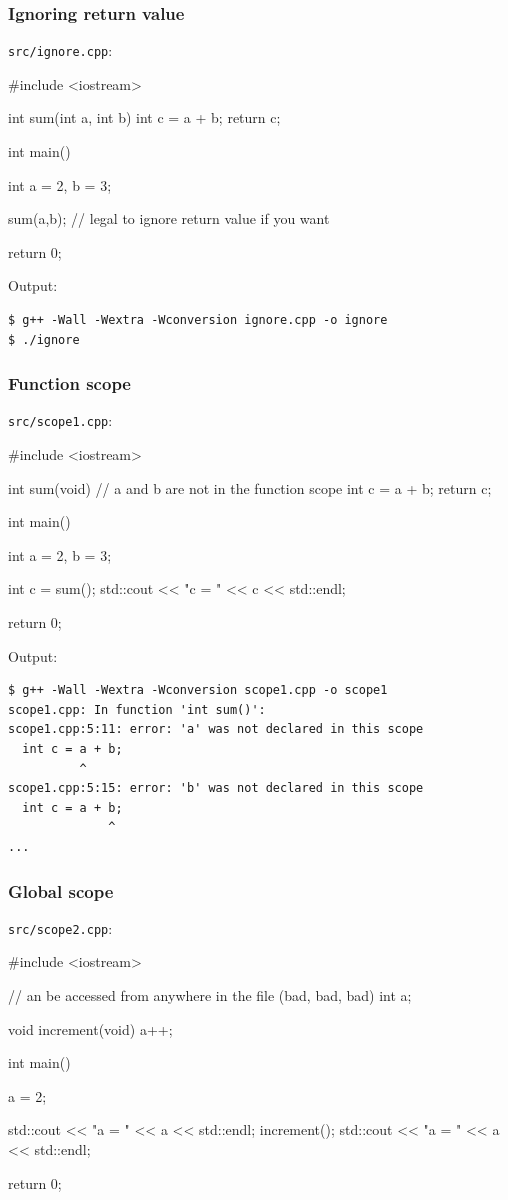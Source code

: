 \documentclass[12pt,letterpaper,twoside]{article}
\begin{document}
\subsubsection{Ignoring return value}
\texttt{src/ignore.cpp}:

\begin{cpp}
#include <iostream>

int sum(int a, int b) {
  int c = a + b;
  return c;
}

int main() {
  int a = 2, b = 3;

  sum(a,b); // legal to ignore return value if you want

  return 0;
}
\end{cpp}

Output:

\begin{verbatim}
$ g++ -Wall -Wextra -Wconversion ignore.cpp -o ignore
$ ./ignore
\end{verbatim}

\subsubsection{Function scope}
\texttt{src/scope1.cpp}:

\begin{cpp}
#include <iostream>

int sum(void) {
  // a and b are not in the function scope
  int c = a + b;
  return c;
}

int main() {
  int a = 2, b = 3;

  int c = sum();
  std::cout << "c = " << c << std::endl;

  return 0;
}
\end{cpp}

Output:

\begin{verbatim}
$ g++ -Wall -Wextra -Wconversion scope1.cpp -o scope1
scope1.cpp: In function 'int sum()':
scope1.cpp:5:11: error: 'a' was not declared in this scope
  int c = a + b;
          ^
scope1.cpp:5:15: error: 'b' was not declared in this scope
  int c = a + b;
              ^
...
\end{verbatim}

\subsubsection{Global scope}
\texttt{src/scope2.cpp}:

\begin{cpp}
#include <iostream>

// an be accessed from anywhere in the file (bad, bad, bad)
int a;

void increment(void) {
  a++;
}

int main() {
  a = 2;

  std::cout << "a = " << a << std::endl;
  increment();
  std::cout << "a = " << a << std::endl;

  return 0;
}
\end{cpp}
\end{document}
